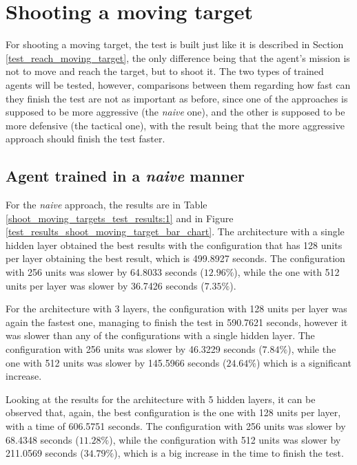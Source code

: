 \section{Shooting a moving target} \label{test_shoot_moving_target}

For shooting a moving target, the test is built just like it is described in Section \ref{test_reach_moving_target}, the only difference being that the agent's mission is not to move and reach the target, but to shoot it. The two types of trained agents will be tested, however, comparisons between them regarding how fast can they finish the test are not as important as before, since one of the approaches is supposed to be more aggressive (the \emph{naive} one), and the other is supposed to be more defensive (the tactical one), with the result being that the more aggressive approach should finish the test faster.

\subsection{Agent trained in a \emph{naive} manner}

For the \emph{naive} approach, the results are in Table \ref{shoot_moving_targets_test_results:1} and in Figure \ref{test_results_shoot_moving_target_bar_chart}. The architecture with a single hidden layer obtained the best results with the configuration that has 128 units per layer obtaining the best result, which is 499.8927 seconds. The configuration with 256 units was slower by 64.8033 seconds ($12.96\%$), while the one with 512 units per layer was slower by 36.7426 seconds ($7.35\%$).

For the architecture with 3 layers, the configuration with 128 units per layer was again the fastest one, managing to finish the test in 590.7621 seconds, however it was slower than any of the configurations with a single hidden layer. The configuration with 256 units was slower by 46.3229 seconds ($7.84\%$), while the one with 512 units was slower by 145.5966 seconds ($24.64\%$) which is a significant increase.

Looking at the results for the architecture with 5 hidden layers, it can be observed that, again, the best configuration is the one with 128 units per layer, with a time of 606.5751 seconds. The configuration with 256 units was slower by 68.4348 seconds ($11.28\%$), while the configuration with 512 units was slower by 211.0569 seconds ($34.79\%$), which is a big increase in the time to finish the test.

